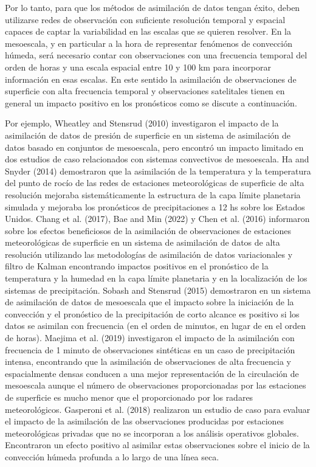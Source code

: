 \documentclass[12pt,oneside,a4paper]{reedthesis}
\begin{document}
Por lo tanto, para que los métodos de asimilación de datos tengan éxito, deben utilizarse redes de observación con suficiente resolución temporal y espacial capaces de captar la variabilidad en las escalas que se quieren resolver. En la mesoescala, y en particular a la hora de representar fenómenos de convección húmeda, será necesario contar con observaciones con una frecuencia temporal del orden de horas y una escala espacial entre 10 y 100 km para incorporar información en esas escalas. En este sentido la asimilación de observaciones de superficie con alta frecuencia temporal y observaciones satelitales tienen en general un impacto positivo en los pronósticos como se discute a continuación.

Por ejemplo, Wheatley and Stensrud (2010) investigaron el impacto de la asimilación de datos de presión de superficie en un sistema de asimilación de datos basado en conjuntos de mesoescala, pero encontró un impacto limitado en dos estudios de caso relacionados con sistemas convectivos de mesoescala. Ha and Snyder (2014) demostraron que la asimilación de la temperatura y la temperatura del punto de rocío de las redes de estaciones meteorológicas de superficie de alta resolución mejoraba sistemáticamente la estructura de la capa límite planetaria simulada y mejoraba los pronósticos de precipitaciones a 12 hs sobre los Estados Unidos. Chang et al. (2017), Bae and Min (2022) y Chen et al. (2016) informaron sobre los efectos beneficiosos de la asimilación de observaciones de estaciones meteorológicas de superficie en un sistema de asimilación de datos de alta resolución utilizando las metodologías de asimilación de datos variacionales y filtro de Kalman encontrando impactos positivos en el pronóstico de la temperatura y la humedad en la capa límite planetaria y en la localización de los sistemas de precipitación. Sobash and Stensrud (2015) demostraron en un sistema de asimilación de datos de mesoescala que el impacto sobre la iniciación de la convección y el pronóstico de la precipitación de corto alcance es positivo si los datos se asimilan con frecuencia (en el orden de minutos, en lugar de en el orden de horas). Maejima et al. (2019) investigaron el impacto de la asimilación con frecuencia de 1 minuto de observaciones sintéticas en un caso de precipitación intensa, encontrando que la asimilación de observaciones de alta frecuencia y espacialmente densas conducen a una mejor representación de la circulación de mesoescala aunque el número de observaciones proporcionadas por las estaciones de superficie es mucho menor que el proporcionado por los radares meteorológicos. Gasperoni et al. (2018) realizaron un estudio de caso para evaluar el impacto de la asimilación de las observaciones producidas por estaciones meteorológicas privadas que no se incorporan a los análisis operativos globales. Encontraron un efecto positivo al asimilar estas observaciones sobre el inicio de la convección húmeda profunda a lo largo de una línea seca.
\end{document}
